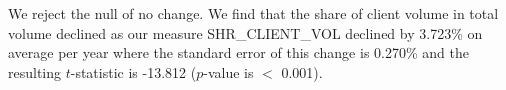 We reject the null of no change. We find that the share of client volume in total volume declined as our measure SHR\_CLIENT\_VOL declined by 3.723\% on average per year where the standard error of this change is 0.270\% and the resulting $t$-statistic is -13.812 ($p$-value is $<$ 0.001).